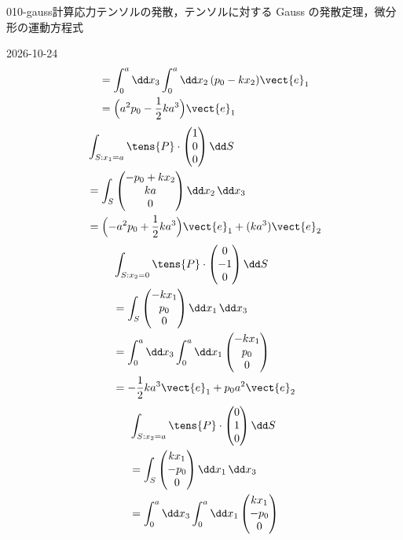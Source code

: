 \documentclass[uplatex,dvipdfmx,a4paper,11pt]{jsarticle}
\begin{document}
\begin{mondai}{010-gauss}{計算}{応力テンソルの発散，テンソルに対する Gauss の発散定理，微分形の運動方程式}
\begin{kotaeutsushi}{2026-10-24}
\begin{align*}
&=\int_{0}^{a}\dd x_{3}\int_{0}^{a}\dd x_{2}\,(p_{0}-kx_{2})\vect{e}_{1}\\
&=\Bigl(a^{2}p_{0}-\frac{1}{2}ka^{3}\Bigr)\vect{e}_{1}
\end{align*}
\begin{align*}
&\int_{S:x_{1}=a}\tens{P}\cdot\begin{pmatrix}1\\0\\0\end{pmatrix}\dd S\\
&=\int_{S}\begin{pmatrix}-p_{0}+kx_{2}\\ka\\0\end{pmatrix}\dd x_{2}\,\dd x_{3}\\
&=\Bigl(-a^{2}p_{0}+\frac{1}{2}ka^{3}\Bigr)\vect{e}_{1}+(ka^{3})\vect{e}_{2}
\end{align*}
\begin{align*}
&\int_{S:x_{2}=0}\tens{P}\cdot\begin{pmatrix}0\\-1\\0\end{pmatrix}\dd S\\
&=\int_{S}\begin{pmatrix}-kx_{1}\\p_{0}\\0\end{pmatrix}\dd x_{1}\,\dd x_{3}\\
&=\int_{0}^{a}\dd x_{3}\int_{0}^{a}\dd x_{1}\begin{pmatrix}-kx_{1}\\p_{0}\\0\end{pmatrix}\\
&=-\frac{1}{2}ka^{3}\vect{e}_{1}+p_{0}a^{2}\vect{e}_{2}
\end{align*}
\begin{align*}
&\int_{S:x_{2}=a}\tens{P}\cdot\begin{pmatrix}0\\1\\0\end{pmatrix}\dd S\\
&=\int_{S}\begin{pmatrix}kx_{1}\\-p_{0}\\0\end{pmatrix}\dd x_{1}\,\dd x_{3}\\
&=\int_{0}^{a}\dd x_{3}\int_{0}^{a}\dd x_{1}\begin{pmatrix}kx_{1}\\-p_{0}\\0\end{pmatrix}\\

\end{align*}
\end{kotaeutsushi}
\end{mondai}
\end{document}
